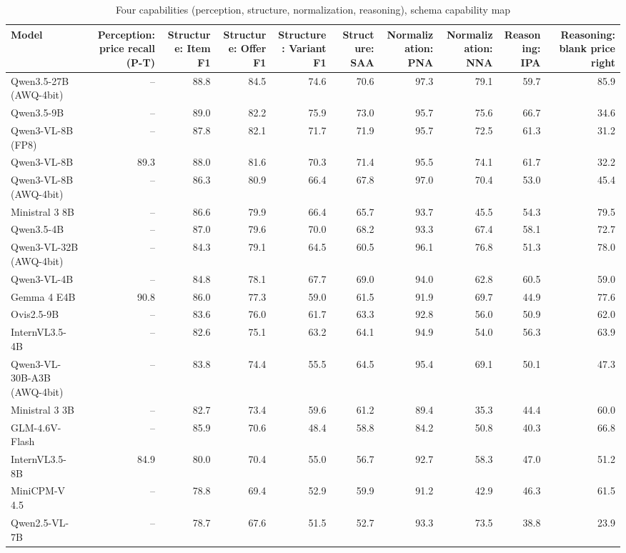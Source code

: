\begin{table}[t]
\centering
\caption{Four capabilities (perception, structure, normalization, reasoning), schema capability map}
\label{tab:capabilities}
\small
\begin{tabular}{lrrrrrrrrr}
\toprule
Model & Perception: price recall (P-T) & Structure: Item F1 & Structure: Offer F1 & Structure: Variant F1 & Structure: SAA & Normalization: PNA & Normalization: NNA & Reasoning: IPA & Reasoning: blank price right \\
\midrule
Qwen3.5-27B (AWQ-4bit) & – & 88.8 & 84.5 & 74.6 & 70.6 & 97.3 & 79.1 & 59.7 & 85.9 \\
Qwen3.5-9B & – & 89.0 & 82.2 & 75.9 & 73.0 & 95.7 & 75.6 & 66.7 & 34.6 \\
Qwen3-VL-8B (FP8) & – & 87.8 & 82.1 & 71.7 & 71.9 & 95.7 & 72.5 & 61.3 & 31.2 \\
Qwen3-VL-8B & 89.3 & 88.0 & 81.6 & 70.3 & 71.4 & 95.5 & 74.1 & 61.7 & 32.2 \\
Qwen3-VL-8B (AWQ-4bit) & – & 86.3 & 80.9 & 66.4 & 67.8 & 97.0 & 70.4 & 53.0 & 45.4 \\
Ministral 3 8B & – & 86.6 & 79.9 & 66.4 & 65.7 & 93.7 & 45.5 & 54.3 & 79.5 \\
Qwen3.5-4B & – & 87.0 & 79.6 & 70.0 & 68.2 & 93.3 & 67.4 & 58.1 & 72.7 \\
Qwen3-VL-32B (AWQ-4bit) & – & 84.3 & 79.1 & 64.5 & 60.5 & 96.1 & 76.8 & 51.3 & 78.0 \\
Qwen3-VL-4B & – & 84.8 & 78.1 & 67.7 & 69.0 & 94.0 & 62.8 & 60.5 & 59.0 \\
Gemma 4 E4B & 90.8 & 86.0 & 77.3 & 59.0 & 61.5 & 91.9 & 69.7 & 44.9 & 77.6 \\
Ovis2.5-9B & – & 83.6 & 76.0 & 61.7 & 63.3 & 92.8 & 56.0 & 50.9 & 62.0 \\
InternVL3.5-4B & – & 82.6 & 75.1 & 63.2 & 64.1 & 94.9 & 54.0 & 56.3 & 63.9 \\
Qwen3-VL-30B-A3B (AWQ-4bit) & – & 83.8 & 74.4 & 55.5 & 64.5 & 95.4 & 69.1 & 50.1 & 47.3 \\
Ministral 3 3B & – & 82.7 & 73.4 & 59.6 & 61.2 & 89.4 & 35.3 & 44.4 & 60.0 \\
GLM-4.6V-Flash & – & 85.9 & 70.6 & 48.4 & 58.8 & 84.2 & 50.8 & 40.3 & 66.8 \\
InternVL3.5-8B & 84.9 & 80.0 & 70.4 & 55.0 & 56.7 & 92.7 & 58.3 & 47.0 & 51.2 \\
MiniCPM-V 4.5 & – & 78.8 & 69.4 & 52.9 & 59.9 & 91.2 & 42.9 & 46.3 & 61.5 \\
Qwen2.5-VL-7B & – & 78.7 & 67.6 & 51.5 & 52.7 & 93.3 & 73.5 & 38.8 & 23.9 \\

\end{tabular}
\end{table}
